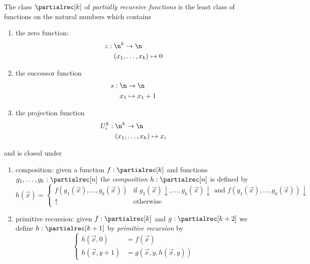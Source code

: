\begin{definition}
  The class \(\partialrec[k]\) of \emph{partially recursive functions}
  is the least class of functions on the natural numbers which
  contains
  \begin{enumerate}[label=(\alph*)]
  \item\label{parec:a} the zero function:
    \begin{align*}
      z : \; & \n^k \to \n \\
      & (x_1, \dots, x_k) \mapsto 0
    \end{align*}
  \item\label{parec:b} the successor function
    \begin{align*}
      s : \; & \n \to \n \\
      & x_1 \mapsto x_1 + 1
    \end{align*}
  \item\label{parec:c} the projection function
    \begin{align*}
      U_i^k : \; & \n^k \to \n \\
      & (x_1,\dots,x_k) \mapsto x_i
    \end{align*}
  \end{enumerate}
  and is closed under
  \begin{enumerate}[label=(\arabic*)]
  \item\label{parec:1} composition: given a function
    \(f : \partialrec[k]\) and functions
    \(g_1, \dots, g_k : \partialrec[n]\) the \emph{composition}
    \(h : \partialrec[n]\) is defined by
    \begin{equation*}
      h(\vec{x}) =
      \begin{cases}
        f(g_1(\vec{x}), \dots, g_k(\vec{x})) & \text{if } g_1(\vec{x}) \downarrow, \dots, g_k(\vec{x}) \downarrow \text{ and } f(g_1(\vec{x}), \dots, g_k(\vec{x})) \downarrow \\
        \uparrow & \text{otherwise}
      \end{cases}
    \end{equation*}
  \item\label{parec:2} primitive recursion: given
    \(f : \partialrec[k]\) and \(g : \partialrec[k+2]\) we define
    \(h : \partialrec[k+1]\) by \emph{primitive recursion} by
    \begin{equation*}
      \begin{cases}
        h(\vec{x}, 0) & = f(\vec{x}) \\
        h(\vec{x}, y + 1) & = g(\vec{x}, y, h(\vec{x}, y))

\end{cases}
\end{equation*}
\end{enumerate}
\end{definition}
